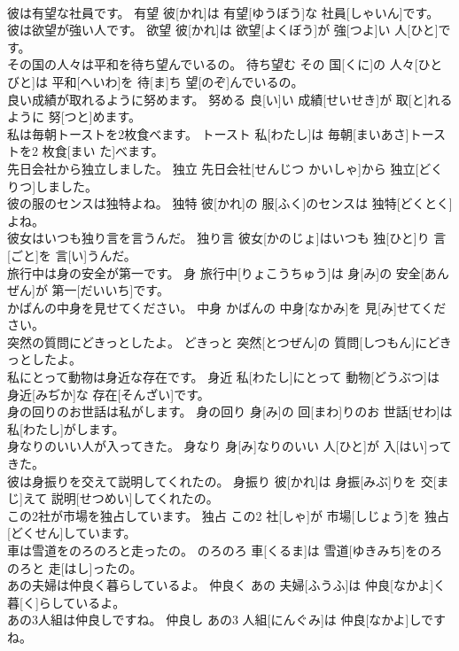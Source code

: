 \documentclass[8pt]{extreport}
\begin{document}
\begin{CJK}{UTF8}{min}
\\	彼は有望な社員です。	有望	彼[かれ]は 有望[ゆうぼう]な 社員[しゃいん]です。	
\\	彼は欲望が強い人です。	欲望	彼[かれ]は 欲望[よくぼう]が 強[つよ]い 人[ひと]です。	
\\	その国の人々は平和を待ち望んでいるの。	待ち望む	その 国[くに]の 人々[ひとびと]は 平和[へいわ]を 待[ま]ち 望[のぞ]んでいるの。	
\\	良い成績が取れるように努めます。	努める	良[い]い 成績[せいせき]が 取[と]れるように 努[つと]めます。	
\\	私は毎朝トーストを2枚食べます。	トースト	私[わたし]は 毎朝[まいあさ]トーストを2 枚食[まい た]べます。	
\\	先日会社から独立しました。	独立	先日会社[せんじつ かいしゃ]から 独立[どくりつ]しました。	
\\	彼の服のセンスは独特よね。	独特	彼[かれ]の 服[ふく]のセンスは 独特[どくとく]よね。	
\\	彼女はいつも独り言を言うんだ。	独り言	彼女[かのじょ]はいつも 独[ひと]り 言[ごと]を 言[い]うんだ。	
\\	旅行中は身の安全が第一です。	身	旅行中[りょこうちゅう]は 身[み]の 安全[あんぜん]が 第一[だいいち]です。	
\\	かばんの中身を見せてください。	中身	かばんの 中身[なかみ]を 見[み]せてください。	
\\	突然の質問にどきっとしたよ。	どきっと	突然[とつぜん]の 質問[しつもん]にどきっとしたよ。	
\\	私にとって動物は身近な存在です。	身近	私[わたし]にとって 動物[どうぶつ]は 身近[みぢか]な 存在[そんざい]です。	
\\	身の回りのお世話は私がします。	身の回り	身[み]の 回[まわ]りのお 世話[せわ]は 私[わたし]がします。	
\\	身なりのいい人が入ってきた。	身なり	身[み]なりのいい 人[ひと]が 入[はい]ってきた。	
\\	彼は身振りを交えて説明してくれたの。	身振り	彼[かれ]は 身振[みぶ]りを 交[まじ]えて 説明[せつめい]してくれたの。	
\\	この2社が市場を独占しています。	独占	この2 社[しゃ]が 市場[しじょう]を 独占[どくせん]しています。	
\\	車は雪道をのろのろと走ったの。	のろのろ	車[くるま]は 雪道[ゆきみち]をのろのろと 走[はし]ったの。	
\\	あの夫婦は仲良く暮らしているよ。	仲良く	あの 夫婦[ふうふ]は 仲良[なかよ]く 暮[く]らしているよ。	
\\	あの3人組は仲良しですね。	仲良し	あの3 人組[にんぐみ]は 仲良[なかよ]しですね。	

\end{CJK}
\end{document}
